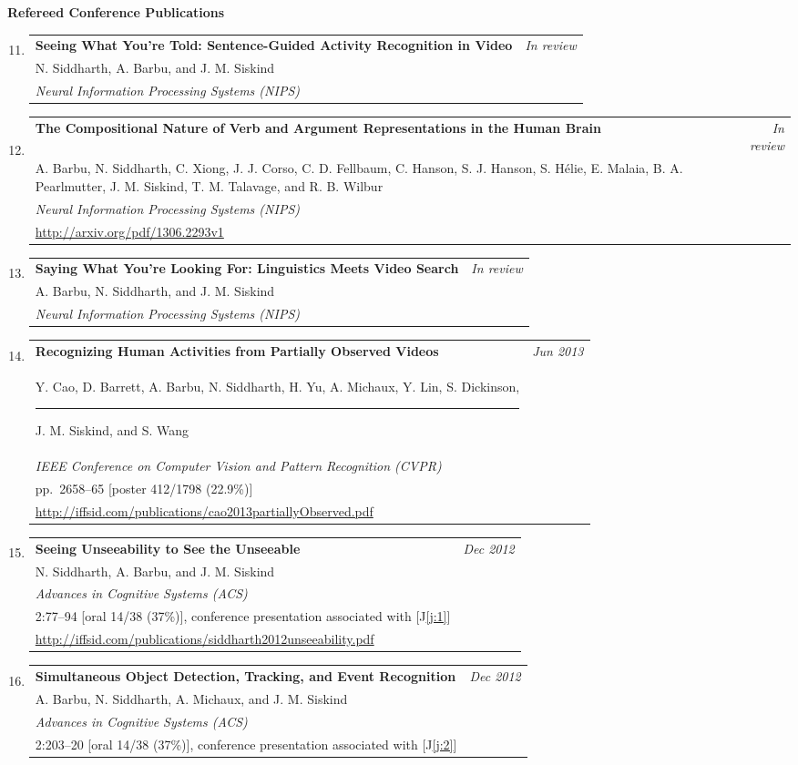 \documentclass[10pt]{article}
\makeatletter
\newenvironment{benumerate}[2]{
    \let\oldItem\item
    \def\item{\addtocounter{enumi}{-2}\oldItem}
    \begin{enumerate}[#2]
    \setcounter{enumi}{#1}
    \addtocounter{enumi}{1}}
  {\end{enumerate}}
\newenvironment{publication}[5]
{ \item
  \begin{tabular*}{6.5in}{p{5.3in}@{\extracolsep{\fill}}r}
    \textbf{#1} & \textit{#2}\\ #3 &\\ \textit{#4}\\ #5
  \end{tabular*}
} {}
\newenvironment{region}[3]{%
  \vspace*{0.5ex}
  {\large \textbf{#1}}
  \begin{benumerate}{#3}{\color{RoyalBlue}#2}}
  {\end{benumerate}}
\makeatother
\begin{document}
\begin{region} {Refereed Conference Publications}{{C}1}{10}
  \begin{publication} {Seeing What You're Told: Sentence-Guided Activity Recognition in Video}
    {In review}
    {N. Siddharth, A. Barbu, and J. M. Siskind}
    {Neural Information Processing Systems (NIPS)}
    {}
  \end{publication}
  \begin{publication} {The Compositional Nature of Verb and Argument Representations in the Human Brain}
    {In review}
    {A. Barbu, N. Siddharth, C. Xiong, J. J. Corso, C. D. Fellbaum, C. Hanson, S. J. Hanson, S.
      H\'elie, E. Malaia, B. A. Pearlmutter, J. M. Siskind, T. M. Talavage, and R. B. Wilbur}
    {Neural Information Processing Systems (NIPS)}
    {\url{http://arxiv.org/pdf/1306.2293v1}}
  \end{publication}
  \begin{publication} {Saying What You're Looking For: Linguistics Meets Video Search}
    {In review}
    {A. Barbu, N. Siddharth, and J. M. Siskind}
    {Neural Information Processing Systems (NIPS)}
    {}
  \end{publication}\newpage
  \begin{publication} {Recognizing Human Activities from Partially Observed Videos}
    {Jun 2013}
    {Y. Cao, D. Barrett, A. Barbu, N. Siddharth, H. Yu, A. Michaux, Y. Lin,
      S. Dickinson, \rule{6ex}{0pt} J. M. Siskind, and S. Wang}
    {IEEE Conference on Computer Vision and Pattern Recognition (CVPR)}
    {pp.~2658--65 \quad\small{[poster 412/1798 (22.9\%)]}\\
      \url{http://iffsid.com/publications/cao2013partiallyObserved.pdf}}
  \end{publication}
  \begin{publication} {Seeing Unseeability to See the Unseeable}
    {Dec 2012}
    {N. Siddharth, A. Barbu, and J. M. Siskind}
    {Advances in Cognitive Systems (ACS)}
    {2:77--94 \quad\small{[oral 14/38 (37\%)], conference presentation associated with [{\color{RoyalBlue}J\ref{j:1}}]}\\
      \url{http://iffsid.com/publications/siddharth2012unseeability.pdf}}
  \end{publication}
  \begin{publication} {Simultaneous Object Detection, Tracking, and Event Recognition}
    {Dec 2012}
    {A. Barbu, N. Siddharth, A. Michaux, and J. M. Siskind}
    {Advances in Cognitive Systems (ACS)}
    {2:203--20 \quad\small{[oral 14/38 (37\%)], conference presentation associated with [{\color{RoyalBlue}J\ref{j:2}}]}\\
}
\end{publication}
\end{region}
\end{document}
